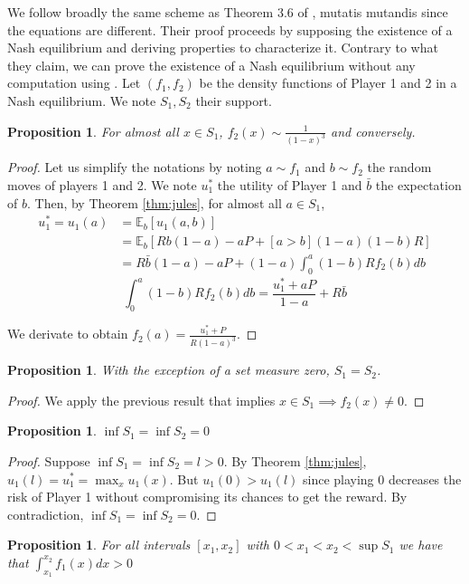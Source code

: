 \documentclass[preprint,12pt,authoryear,doubleblind]{elsarticle}
\newtheorem{proposition}[theorem]{Proposition}
\theoremstyle{definition}
\begin{document}
We follow broadly the same scheme as Theorem 3.6 of \citet{Lotker2008-tx}, mutatis mutandis since the equations are different. Their proof proceeds by supposing the existence of a Nash equilibrium and deriving properties to characterize it. Contrary to what they claim, we can prove the existence of a Nash equilibrium without any computation using \citet{Dasgupta1986-gu}. Let $(f_1, f_2)$ be the density functions of Player 1 and 2 in a Nash equilibrium. We note $S_1, S_2$ their support.
\begin{proposition}
    
For almost all $x \in S_1$, $f_2(x) \sim \frac{1}{(1-x)^3}$ and conversely.
\end{proposition} 
\begin{proof}
Let us simplify the notations by noting $a \sim f_1$ and $b \sim f_2$ the random moves of players 1 and 2.  We note $u_1^*$ the utility of Player 1 and $\bar b$ the expectation of $b$. Then, by Theorem \ref{thm:jules}, for almost all $a\in S_1$,
\begin{align*}u_1^* = u_1(a) &= \mathbb{E}_b[u_1(a, b)]\\
&= \mathbb{E}_b\left[Rb(1-a) - aP  + [a>b](1-a)(1-b)R\right]\\
&= R \bar b (1-a) - a P + (1-a) \int_0^a (1-b) R f_2(b) db\end{align*}
$$\int_0^a (1-b) R f_2(b) db = \frac{u_1^* + aP}{1-a} + R \bar b$$

We derivate to obtain $f_2(a) = \frac{u_1^* + P}{R(1-a)^3} $.
\end{proof}
\begin{proposition}
    With the exception of a set measure zero, $S_1 = S_2$.
\end{proposition} 
\begin{proof}We apply the previous result that implies $x \in S_1 \implies f_2(x) \neq 0$.\end{proof}
\begin{proposition}
    $\inf S_1 = \inf S_2 = 0$
\end{proposition}
\begin{proof}
Suppose $\inf S_1 = \inf S_2 = l > 0$. By Theorem \ref{thm:jules}, $u_1(l) = u_1^* = \max_x u_1(x)$. But $u_1(0) > u_1(l)$ since playing $0$ decreases the risk of Player 1 without compromising its chances to get the reward. By contradiction, $\inf S_1 = \inf S_2 = 0$.
 \end{proof}
\begin{proposition}
For all intervals $[x_1, x_2]$ with $0 < x_1 < x_2 < \sup S_1$ we have that $\int_{x_1}^{x_2} f_1(x) dx > 0$
 \end{proposition}
\end{document}
